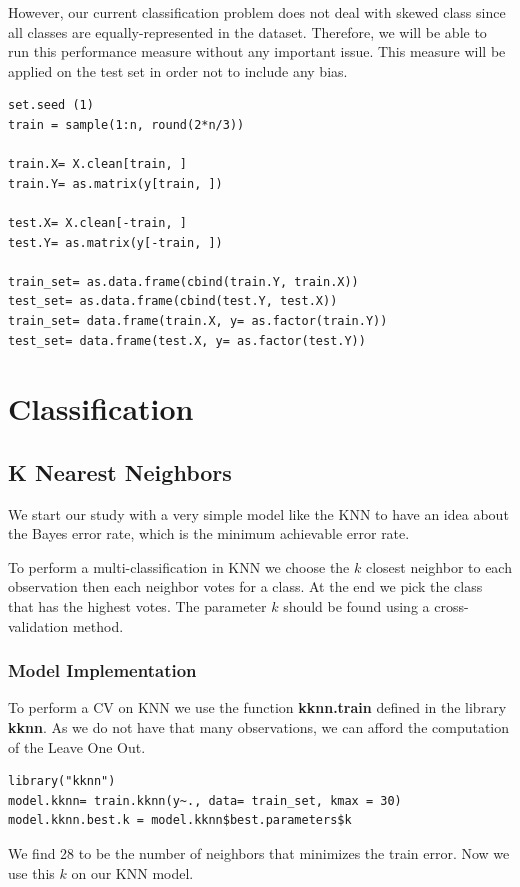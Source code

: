 \documentclass[]{report}
\begin{document}
However, our current classification problem does not deal with skewed class since all classes are equally-represented in the dataset. Therefore, we will be able to run this performance measure without any important issue. This measure will be applied on the test set in order not to include any bias.

\begin{lstlisting}
set.seed (1)
train = sample(1:n, round(2*n/3))

train.X= X.clean[train, ]
train.Y= as.matrix(y[train, ])

test.X= X.clean[-train, ]
test.Y= as.matrix(y[-train, ])

train_set= as.data.frame(cbind(train.Y, train.X))
test_set= as.data.frame(cbind(test.Y, test.X))
train_set= data.frame(train.X, y= as.factor(train.Y))
test_set= data.frame(test.X, y= as.factor(test.Y))
\end{lstlisting}

\pagebreak
\section{Classification}

\subsection{K Nearest Neighbors}
We start our study with a very simple model like the KNN to have an idea about the Bayes error rate, which is the minimum achievable error rate. 

To perform a multi-classification in KNN we choose the $k$ closest neighbor to each observation then each neighbor votes for a  class. At the end we pick the class that has the highest votes. The parameter $k$ should be found using a cross-validation method.

\subsubsection{Model Implementation}
To perform a CV on KNN we use the function \textbf{kknn.train} defined in the library \textbf{kknn}. As we do not have that many observations, we can afford the computation of the Leave One Out.
\begin{lstlisting}
library("kknn")
model.kknn= train.kknn(y~., data= train_set, kmax = 30)
model.kknn.best.k = model.kknn$best.parameters$k
\end{lstlisting}
We find 28 to be the number of neighbors that minimizes the train error. Now we use this $k$ on our KNN model.
\end{document}
